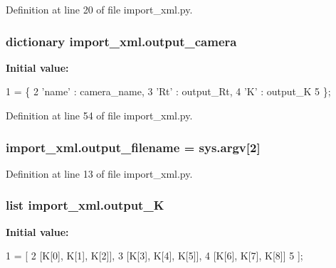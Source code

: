 Definition at line 20 of file import\+\_\+xml.\+py.

\subsubsection[{\texorpdfstring{output\+\_\+camera}{output_camera}}]{\setlength{\rightskip}{0pt plus 5cm}dictionary import\+\_\+xml.\+output\+\_\+camera}\hypertarget{namespaceimport__xml_a0efcba25cb78bff3cebf1a0d5e9e7818}{}\label{namespaceimport__xml_a0efcba25cb78bff3cebf1a0d5e9e7818}
{\bfseries Initial value\+:}
\begin{DoxyCode}
1 = \{
2         \textcolor{stringliteral}{'name'} : camera\_name,
3         \textcolor{stringliteral}{'Rt'} : output\_Rt,
4         \textcolor{stringliteral}{'K'} : output\_K
5     \};
\end{DoxyCode}


Definition at line 54 of file import\+\_\+xml.\+py.

\subsubsection[{\texorpdfstring{output\+\_\+filename}{output_filename}}]{\setlength{\rightskip}{0pt plus 5cm}import\+\_\+xml.\+output\+\_\+filename = sys.\+argv\mbox{[}2\mbox{]}}\hypertarget{namespaceimport__xml_a307ad9a3391d6a9cb512087355ad9a0b}{}\label{namespaceimport__xml_a307ad9a3391d6a9cb512087355ad9a0b}


Definition at line 13 of file import\+\_\+xml.\+py.

\subsubsection[{\texorpdfstring{output\+\_\+K}{output_K}}]{\setlength{\rightskip}{0pt plus 5cm}list import\+\_\+xml.\+output\+\_\+K}\hypertarget{namespaceimport__xml_a1993df83e9785cc32d460d46661f5ca7}{}\label{namespaceimport__xml_a1993df83e9785cc32d460d46661f5ca7}
{\bfseries Initial value\+:}
\begin{DoxyCode}
1 = [
2         [K[0], K[1], K[2]],
3         [K[3], K[4], K[5]],
4         [K[6], K[7], K[8]]
5     ];
\end{DoxyCode}


